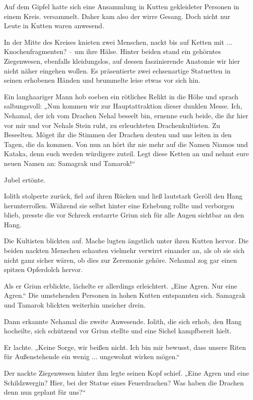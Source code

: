 Auf dem Gipfel hatte sich eine Ansammlung in Kutten gekleideter Personen in einem Kreis. versammelt. Daher kam also der wirre Gesang. Doch nicht nur Leute in Kutten waren anwesend.

In der Mitte des Kreises knieten zwei Menschen, nackt bis auf Ketten mit ... Knochenfragmenten? – um ihre Hälse. Hinter beiden stand ein gehörntes Ziegenwesen, ebenfalls kleidungslos, auf dessen faszinierende Anatomie wir hier nicht näher eingehen wollen. Es präsentierte zwei echsenartige Statuetten in seinen erhobenen Händen und brummelte leise etwas vor sich hin.

Ein langhaariger Mann hob soeben ein rötliches Relikt in die Höhe und sprach salbungsvoll: „Nun kommen wir zur Hauptattraktion dieser dunklen Messe. Ich, Nehamal, der ich vom Drachen Nehal beseelt bin, ernenne euch beide, die ihr hier vor mir und vor Nehals Stein ruht, zu erleuchteten Drachenkultisten. Zu Beseelten. Möget ihr die Stimmen der Drachen deuten und uns leiten in den Tagen, die da kommen. Von nun an hört ihr nie mehr auf die Namen Niamos und Kataka, denn euch werden würdigere zuteil. Legt diese Ketten an und nehmt eure neuen Namen an: Samagrak und Tamarok!“

Jubel ertönte.

Iolith stolperte zurück, fiel auf ihren Rücken und ließ lautstark Geröll den Hang herunterrollen. Während sie selbst hinter eine Erhebung rollte und verborgen blieb, presste die vor Schreck erstarrte Griun sich für alle Augen sichtbar an den Hang.

Die Kultisten blickten auf. Mache lugten ängstlich unter ihren Kutten hervor. Die beiden nackten Menschen schauten vielmehr verwirrt einander an, als ob sie sich nicht ganz sicher wären, ob dies zur Zeremonie gehöre. Nehamal zog gar einen spitzen Opferdolch hervor.

Als er Griun erblickte, lächelte er allerdings erleichtert. „Eine Agren. Nur eine Agren.“ Die umstehenden Personen in hohen Kutten entspannten sich. Samagrak und Tamarok blickten weiterhin unsicher drein.

Dann erkannte Nehamal die zweite Anwesende. Iolith, die sich erhob, den Hang hocheilte, sich schützend vor Griun stellte und eine Sichel kampfbereit hielt.

Er lachte. „Keine Sorge, wir beißen nicht. Ich bin mir bewusst, dass unsere Riten für Außenstehende ein wenig ... ungewohnt wirken mögen.“

Der nackte Ziegenwesen hinter ihm legte seinen Kopf schief. „Eine Agren und eine Schildzwergin? Hier, bei der Statue eines Feuerdrachen? Was haben die Drachen denn nun geplant für uns?“

